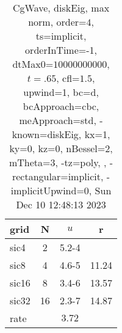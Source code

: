 \begin{table}[H]\tableFont %
\begin{center}
\begin{tabular}{|l|c|c|c|} \hline 
grid  & N &  $ u $ & r \\ \hline 
      sic4 &     2 & \num{5.2}{-4} &        \\ \hline
      sic8 &     4 & \num{4.6}{-5} & 11.24  \\ \hline
     sic16 &     8 & \num{3.4}{-6} & 13.57  \\ \hline
     sic32 &    16 & \num{2.3}{-7} & 14.87  \\ \hline
    rate             &       &  $3.72$       &       \\ \hline
\end{tabular}
\caption{CgWave, diskEig, max norm, order=$4$, ts=implicit, orderInTime=-1, dtMax0=$10000000000$, $t=.65$, cfl=$1.5$, upwind=1, bc=d, bcApproach=cbc, meApproach=std, -known=diskEig, kx=1, ky=0, kz=0, nBessel=2, mTheta=3, -tz=poly, , -rectangular=implicit, -implicitUpwind=0, Sun Dec 10 12:48:13 2023}\label{table:diskEigOrder4max}
\end{center}
\end{table}

